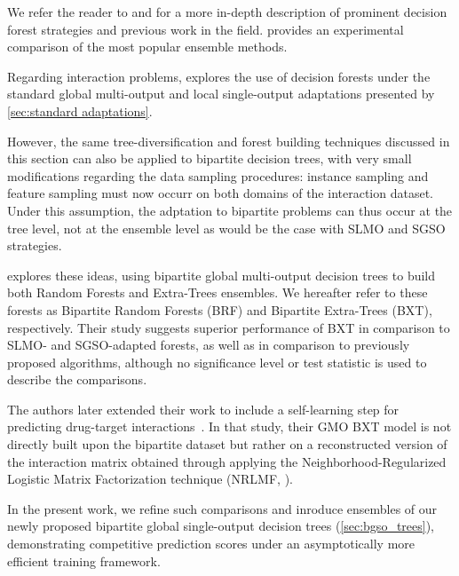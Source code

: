 We refer the reader to \textcite{sagi2018ensemble} and \textcite{fawagreh2014random} for a more in-depth description of prominent decision forest strategies and previous work in the field. \textcite{amasyali2011comparison} provides an experimental comparison of the most popular ensemble methods.  %

Regarding interaction problems, \textcite{schrynemackers2015classifying} explores the use of decision forests under the standard global multi-output and local single-output adaptations presented by \autoref{sec:standard adaptations}.

However, the same tree-diversification and forest building techniques discussed in this section can also be applied to bipartite decision trees, with very small modifications regarding the data sampling procedures: instance sampling and feature sampling must now occurr on both domains of the interaction dataset. Under this assumption, the adptation to bipartite problems can thus occur at the tree level, not at the ensemble level as would be the case with SLMO and SGSO strategies.

\cite{pliakos2019network} explores these ideas, using bipartite global multi-output decision trees to build both Random Forests and Extra-Trees ensembles. We hereafter refer to these forests as Bipartite Random Forests (BRF) and Bipartite Extra-Trees (BXT), respectively. Their study suggests superior performance of BXT in comparison to SLMO- and SGSO-adapted forests, as well as in comparison to previously proposed algorithms, although no significance level or test statistic is used to describe the comparisons.

The authors later extended their work to include a self-learning step for predicting drug-target interactions~\cite{pliakos2020drugtarget}. In that study, their GMO BXT model is not directly built upon the bipartite dataset but rather on a reconstructed version of the interaction matrix obtained through applying the Neighborhood-Regularized Logistic Matrix Factorization technique (NRLMF, \textcite{liu2016neighborhood}).

In the present work, we refine such comparisons and inroduce ensembles of our newly proposed bipartite global single-output decision trees (\autoref{sec:bgso_trees}), demonstrating competitive prediction scores under an asymptotically more efficient training framework.


